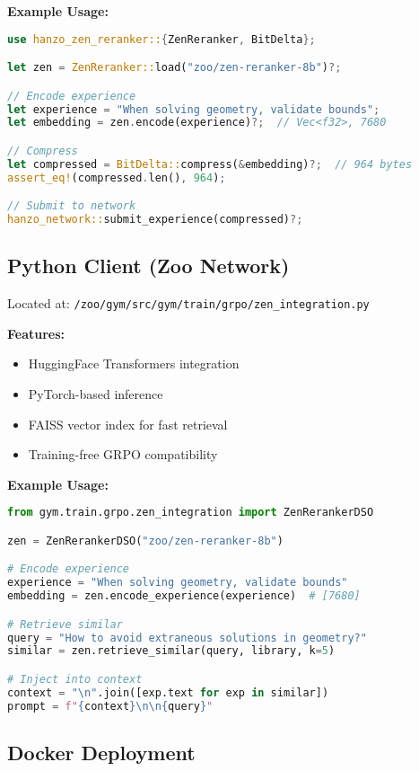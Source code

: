 \documentclass[11pt,a4paper]{article}
\begin{document}
\textbf{Example Usage:}
\begin{lstlisting}[language=Rust, basicstyle=\small\ttfamily]
use hanzo_zen_reranker::{ZenReranker, BitDelta};

let zen = ZenReranker::load("zoo/zen-reranker-8b")?;

// Encode experience
let experience = "When solving geometry, validate bounds";
let embedding = zen.encode(experience)?;  // Vec<f32>, 7680

// Compress
let compressed = BitDelta::compress(&embedding)?;  // 964 bytes
assert_eq!(compressed.len(), 964);

// Submit to network
hanzo_network::submit_experience(compressed)?;
\end{lstlisting}

\subsection{Python Client (Zoo Network)}

Located at: \texttt{/zoo/gym/src/gym/train/grpo/zen\_integration.py}

\textbf{Features:}
\begin{itemize}
\item HuggingFace Transformers integration
\item PyTorch-based inference
\item FAISS vector index for fast retrieval
\item Training-free GRPO compatibility
\end{itemize}

\textbf{Example Usage:}
\begin{lstlisting}[language=Python, basicstyle=\small\ttfamily]
from gym.train.grpo.zen_integration import ZenRerankerDSO

zen = ZenRerankerDSO("zoo/zen-reranker-8b")

# Encode experience
experience = "When solving geometry, validate bounds"
embedding = zen.encode_experience(experience)  # [7680]

# Retrieve similar
query = "How to avoid extraneous solutions in geometry?"
similar = zen.retrieve_similar(query, library, k=5)

# Inject into context
context = "\n".join([exp.text for exp in similar])
prompt = f"{context}\n\n{query}"
\end{lstlisting}

\subsection{Docker Deployment}
\end{document}
